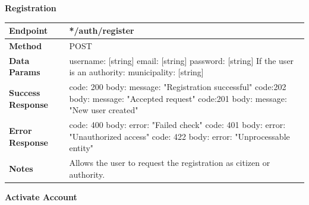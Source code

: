 \documentclass{report}
\begin{document}
\begin{center}{\textbf{Registration}}\end{center}
\begin{tabular}{| l | p{8cm} |}
    \hline
    \textbf{Endpoint} & */auth/register \\
    \hline
    \textbf{Method} & POST \\
    \hline
    \textbf{Data Params} & username: [string] \newline email: [string] \newline password: [string] \newline If the user is an authority: \newline municipality: [string]\\
    \hline
    \textbf{Success Response} & code: 200 \newline body: {message: "Registration successful"} \newline \newline code:202 \newline body: {message: "Accepted request"}
    \newline \newline code:201 \newline body: {message: "New user created"}\\
    \hline
    \textbf{Error Response} & code: 400 \newline body: {error: "Failed check"} \newline \newline code: 401 \newline body: {error: "Unauthorized access"} \newline \newline code: 422 \newline body: {error: "Unprocessable entity"}   \\
    \hline
    \textbf{Notes} & Allows the user to request the registration as citizen or authority. \\
    \hline
\end{tabular}
\clearpage
\begin{center}{\textbf{Activate Account}}\end{center}
\end{document}
